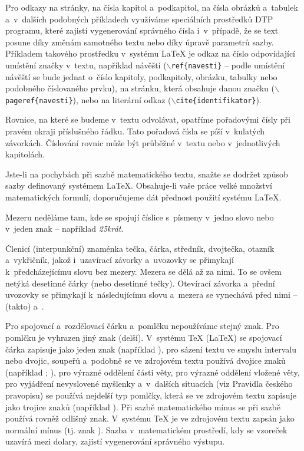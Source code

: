 Pro odkazy na stránky, na čísla kapitol a~podkapitol, na čísla obrázků a~tabulek a~v~dalších podobných příkladech využíváme speciálních prostředků DTP programu, které zajistí vygenerování správného čísla i~v~případě, že se text posune díky změnám samotného textu nebo díky úpravě parametrů sazby. Příkladem takového prostředku v~systému LaTeX je odkaz na číslo odpovídající umístění značky v~textu, například návěští ($\backslash${\tt ref\{navesti\}} -- podle umístění návěští se bude jednat o~číslo kapitoly, podkapitoly, obrázku, tabulky nebo podobného číslovaného prvku), na stránku, která obsahuje danou značku ($\backslash${\tt pageref\{navesti\}}), nebo na literární odkaz ($\backslash${\tt cite\{identifikator\}}).

Rovnice, na které se budeme v~textu odvolávat, opatříme pořadovými čísly při pravém okraji příslušného řádku. Tato pořadová čísla se píší v~kulatých závorkách. Číslování rovnic může být průběžné v~textu nebo v~jednotlivých kapitolách.

Jste-li na pochybách při sazbě matematického textu, snažte se dodržet způsob sazby definovaný systémem LaTeX. Obsahuje-li vaše práce velké množství matematických formulí, doporučujeme dát přednost použití systému LaTeX.

Mezeru neděláme tam, kde se spojují číslice s~písmeny v~jedno slovo nebo v~jeden znak -- například {\it 25krát}.

Členicí (interpunkční) znaménka tečka, čárka, středník, dvojtečka, otazník a~vykřičník, jakož i~uzavírací závorky a~uvozovky se přimykají k~předcházejícímu slovu bez mezery. Mezera se dělá až za nimi. To se ovšem netýká desetinné čárky (nebo desetinné tečky). Otevírací závorka a~přední uvozovky se přimykají k~následujícímu slovu a~mezera se vynechává před nimi -- (takto) a~.

Pro spojovací a~rozdělovací čárku a~pomlčku nepoužíváme stejný znak. Pro pomlčku je vyhrazen jiný znak (delší). V~systému TeX (LaTeX) se spojovací čárka zapisuje jako jeden znak  (například ), pro sázení textu ve smyslu intervalu nebo dvojic, soupeřů a~podobně se ve zdrojovém textu používá dvojice znaků  (například ; ), pro výrazné oddělení části věty, pro výrazné oddělení vložené věty, pro vyjádření nevyslovené myšlenky a~v~dalších situacích (viz Pravidla českého pravopisu) se používá nejdelší typ pomlčky, která se ve zdrojovém textu zapisuje jako trojice znaků  (například ). Při sazbě matematického mínus se při sazbě používá rovněž odlišný znak. V~systému TeX je ve zdrojovém textu zapsán jako normální mínus (tj. znak ). Sazba v~matematickém prostředí, kdy se vzoreček uzavírá mezi dolary, zajistí vygenerování správného výstupu.

